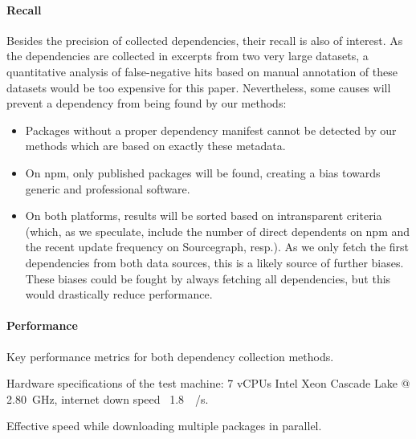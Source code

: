 \paragraph{Recall}
\label{sec:evaluation/resqu1/recall}

Besides the precision of collected dependencies, their recall is also of interest.
As the dependencies are collected in excerpts from two very large datasets, a quantitative analysis of false-negative hits based on manual annotation of these datasets would be too expensive for this paper.
Nevertheless, some causes will prevent a dependency from being found by our methods:

\begin{itemize}
	\item Packages without a proper dependency manifest cannot be detected by our methods which are based on exactly these metadata.
	\item On npm, only published packages will be found, creating a bias towards generic and professional software.
	\item On both platforms, results will be sorted based on intransparent criteria (which, as we speculate, include the number of direct dependents on npm and the recent update frequency on Sourcegraph, resp.).
		As we only fetch the first dependencies from both data sources, this is a likely source of further biases.
		These biases could be fought by always fetching all dependencies, but this would drastically reduce performance.
\end{itemize}

\paragraph{Performance}
\label{sec:evaluation/resqu1/performance}

\begin{table}
	\caption{Key performance metrics for both dependency collection methods.}
	\label{tab:evaluation/resqu1/performance}

	\centering
	\begin{threeparttable}
		\renewcommand\theadfont{\normalsize}
		
		\begin{tablenotes}
			\footnotesize
			\item[\alphtnotetext{1}] Hardware specifications of the test machine: 7 vCPUs Intel Xeon Cascade Lake @ \SI{2.80}{\giga\hertz}, internet down speed ~\SI{1.8}{\giga\bit/\second}.
			\item[\alphtnotetext{2}] Effective speed while downloading multiple packages in parallel.
		\end{tablenotes}
	\end{threeparttable}
\end{table}

